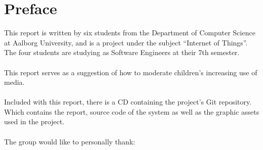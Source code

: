 \chapter*{Preface}
\label{chap:preface}
This report is written by six students from the Department of Computer Science at Aalborg University, and is a project under the subject ``Internet of Things''. The four students are studying as Software Engineers at their 7th semester.\\
\\
This report serves as a suggestion of how to moderate children's increasing use of media.\\
\\
Included with this report, there is a CD containing the project's Git repository. Which contains the report, source code of the system as well as the graphic assets used in the project.\\
\\
The group would like to personally thank:\\

